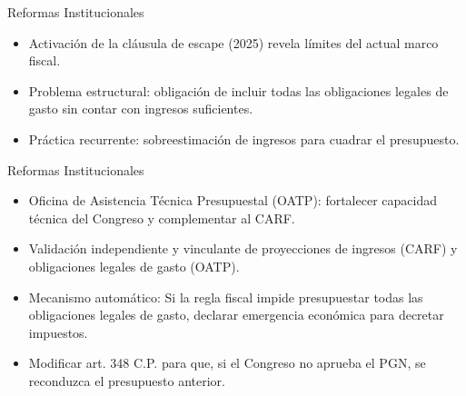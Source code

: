 \begin{frame}{Reformas Institucionales}
\begin{itemize}
    \item Activación de la cláusula de escape (2025) revela límites del actual marco fiscal.
    \item Problema estructural: obligación de incluir todas las obligaciones legales de gasto sin contar con ingresos suficientes.
    \item Práctica recurrente: sobreestimación de ingresos para cuadrar el presupuesto.
\end{itemize}
\end{frame}

\begin{frame}{Reformas Institucionales}
\begin{itemize}
    \item Oficina de Asistencia Técnica Presupuestal (OATP): fortalecer capacidad técnica del Congreso y complementar al CARF.
    \item Validación independiente y vinculante de proyecciones de ingresos (CARF) y obligaciones legales de gasto (OATP).
    \item Mecanismo automático: Si la regla fiscal impide presupuestar todas las obligaciones legales de gasto,  declarar emergencia económica para decretar impuestos.
    \item Modificar art. 348 C.P. para que, si el Congreso no aprueba el PGN, se reconduzca el presupuesto anterior.
\end{itemize}
\end{frame}

